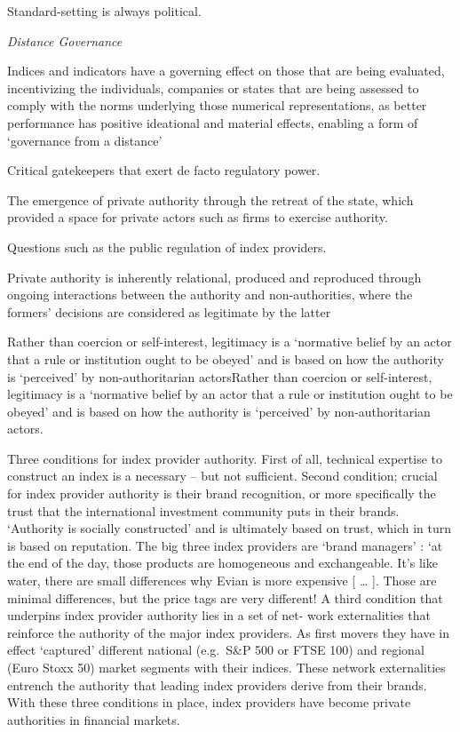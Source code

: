 \documentclass[
]{book}
\begin{document}
Standard-setting is always political.

\emph{Distance Governance}

Indices and indicators have a governing effect on those that are being evaluated,
incentivizing the individuals, companies or states that are being assessed
to comply with the norms underlying those numerical representations,
as better performance has positive ideational and material effects,
enabling a form of `governance from a distance'

Critical gatekeepers that exert de facto regulatory power.

The emergence of private authority through the retreat of the state,
which provided a space for private actors such as firms to exercise authority.

Questions such as the public regulation of index providers.

Private authority is inherently relational, produced and
reproduced through ongoing interactions between the authority and non-authorities,
where the formers' decisions are considered as legitimate by the latter

Rather than coercion or self-interest, legitimacy is a `normative belief
by an actor that a rule or institution ought to be obeyed' and is based on how the
authority is `perceived' by non-authoritarian actorsRather than coercion or self-interest,
legitimacy is a `normative belief by an actor that a rule or institution ought to be obeyed'
and is based on how the authority is `perceived' by non-authoritarian actors.

Three conditions for index provider authority.
First of all, technical expertise to construct an index is a necessary -- but not sufficient.
Second condition; crucial for index provider authority is their brand recognition,
or more specifically the trust that the international investment community puts in their brands.
`Authority is socially constructed' and is ultimately based on
trust, which in turn is based on reputation.
The big three index providers are `brand managers'
: `at the end of the day, those products are homogeneous and exchangeable.
It's like water, there are small differences why Evian is more expensive {[} \ldots{} {]}.
Those are minimal differences, but the price tags are very different!
A third condition that underpins index provider authority lies in a set of net-
work externalities that reinforce the authority of the major index providers. As first
movers they have in effect `captured' different national (e.g.~S\&P 500 or FTSE 100)
and regional (Euro Stoxx 50) market segments with their indices.
These network externalities entrench the authority
that leading index providers derive from their brands. With these three conditions in
place, index providers have become private authorities in financial markets.
\end{document}
